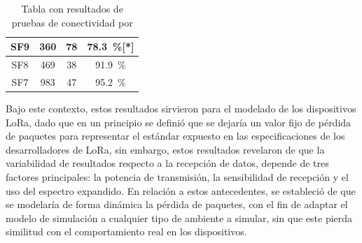 \begin{justify}
\begin{table}[!ht]
\begin{tabular}{|c|c|c|c|}
SF9 & 360 & 78 & \SI{78.3}{\percent}[*]\\
\hline
SF8 & 469 & 38 & \SI{91.9}{\percent}\\
\hline
SF7 & 983 & 47 & \SI{95.2}{\percent}\\
\hline
\end{tabular}
\caption{Tabla con resultados de pruebas de conectividad por }
\label{prueba:real}
\end{table}
\newpage \noindent
Bajo este contexto, estos resultados sirvieron para el modelado de los dispositivos LoRa, dado que en un principio se definió que se dejaría un valor fijo de pérdida de paquetes para representar el estándar expuesto en las especificaciones de los desarrolladores de LoRa, sin embargo, estos resultados revelaron de que la variabilidad de resultados respecto a la recepción de datos, depende de tres factores principales: la potencia de transmisión, la sensibilidad de recepción y el uso del espectro expandido. En relación a estos antecedentes, se estableció de que se modelaría de forma dinámica la pérdida de paquetes, con el fin de adaptar el modelo de simulación a cualquier tipo de ambiente a simular, sin que este pierda similitud con el comportamiento real en los dispositivos.

\end{justify}
